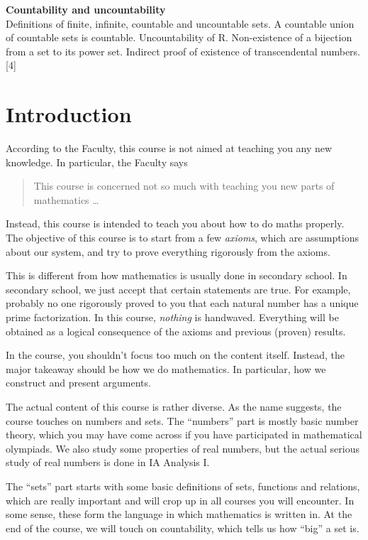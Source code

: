 \documentclass[a4paper]{article}
\begin{document}
{  \vspace{10pt}
  \noindent\textbf{Countability and uncountability}\\
  Definitions of finite, infinite, countable and uncountable sets. A countable union of countable sets is countable. Uncountability of R. Non-existence of a bijection from a set to its power set. Indirect proof of existence of transcendental numbers.\hspace*{\fill}[4]}

\tableofcontents

\setcounter{section}{-1}
\section{Introduction}
According to the Faculty, this course is not aimed at teaching you any new knowledge. In particular, the Faculty says
\begin{quote}
  This course is concerned not so much with teaching you new parts of mathematics \ldots
\end{quote}
Instead, this course is intended to teach you about how to do maths properly. The objective of this course is to start from a few \emph{axioms}, which are assumptions about our system, and try to prove everything rigorously from the axioms.

This is different from how mathematics is usually done in secondary school. In secondary school, we just accept that certain statements are true. For example, probably no one rigorously proved to you that each natural number has a unique prime factorization. In this course, \emph{nothing} is handwaved. Everything will be obtained as a logical consequence of the axioms and previous (proven) results.

In the course, you shouldn't focus too much on the content itself. Instead, the major takeaway should be how we do mathematics. In particular, how we construct and present arguments.

The actual content of this course is rather diverse. As the name suggests, the course touches on numbers and sets. The ``numbers'' part is mostly basic number theory, which you may have come across if you have participated in mathematical olympiads. We also study some properties of real numbers, but the actual serious study of real numbers is done in IA Analysis I.

The ``sets'' part starts with some basic definitions of sets, functions and relations, which are really important and will crop up in all courses you will encounter. In some sense, these form the language in which mathematics is written in. At the end of the course, we will touch on countability, which tells us how ``big'' a set is.
\end{document}
